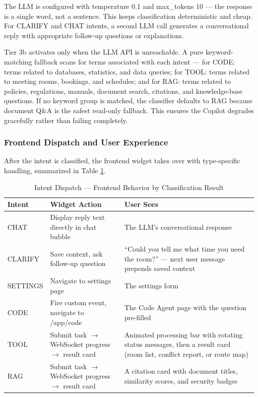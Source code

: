The LLM is configured with temperature 0.1 and max\_tokens 10 --- the response is a single word, not a sentence. This keeps classification deterministic and cheap. For CLARIFY and CHAT intents, a second LLM call generates a conversational reply with appropriate follow-up questions or explanations.

Tier 3b activates only when the LLM API is unreachable. A pure keyword-matching fallback scans for terms associated with each intent --- for CODE: terms related to databases, statistics, and data queries; for TOOL: terms related to meeting rooms, bookings, and schedules; and for RAG: terms related to policies, regulations, manuals, document search, citations, and knowledge-base questions. If no keyword group is matched, the classifier defaults to RAG because document Q\&A is the safest read-only fallback. This ensures the Copilot degrades gracefully rather than failing completely.

\subsubsection{Frontend Dispatch and User Experience}

After the intent is classified, the frontend widget takes over with type-specific handling, summarized in Table \ref{tab:intent-dispatch}.

\begin{table}[H]
\centering
\small\singlespacing
\caption{Intent Dispatch --- Frontend Behavior by Classification Result}
\label{tab:intent-dispatch}
\begin{tabularx}{\textwidth}{>{\RaggedRight\arraybackslash}p{}>{\RaggedRight\arraybackslash}p{}>{\RaggedRight\arraybackslash}X}
\toprule
\textbf{Intent} & \textbf{Widget Action} & \textbf{User Sees} \\
\midrule
CHAT & Display reply text directly in chat bubble & The LLM's conversational response \\
CLARIFY & Save context, ask follow-up question & ``Could you tell me what time you need the room?'' --- next user message prepends saved context \\
SETTINGS & Navigate to settings page & The settings form \\
CODE & Fire custom event, navigate to /app/code & The Code Agent page with the question pre-filled \\
TOOL & Submit task $\rightarrow$ WebSocket progress $\rightarrow$ result card & Animated processing bar with rotating status messages, then a result card (room list, conflict report, or route map) \\
RAG & Submit task $\rightarrow$ WebSocket progress $\rightarrow$ result card & A citation card with document titles, similarity scores, and security badges \\
\bottomrule
\end{tabularx}
\end{table}

